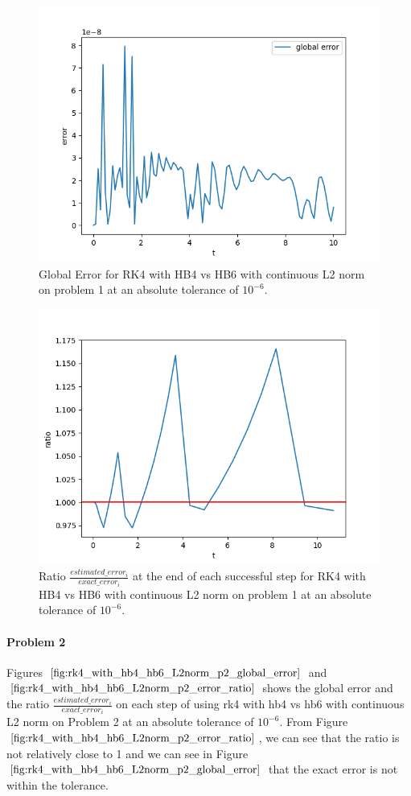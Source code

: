 \begin{figure}[H]
\centering
\includegraphics[width=0.7\linewidth]{./figures/rk4_with_hb4_hb6_L2norm_p1_global_error}
\caption{Global Error for RK4 with HB4 vs HB6 with continuous L2 norm on problem 1 at an absolute tolerance of $10^{-6}$.}
\label{fig:rk4_with_hb4_hb6_L2norm_p1_global_error}
\end{figure}

\begin{figure}[H]
\centering
\includegraphics[width=0.7\linewidth]{./figures/rk4_with_hb4_hb6_L2norm_p1_error_ratio}
\caption{Ratio $\frac{estimated\_error_i}{exact\_error_i}$ at the end of each successful step for RK4 with HB4 vs HB6 with continuous L2 norm on problem 1 at an absolute tolerance of $10^{-6}$.}
\label{fig:rk4_with_hb4_hb6_L2norm_p1_error_ratio}
\end{figure}

\paragraph{Problem 2} Figures $\ref{fig:rk4_with_hb4_hb6_L2norm_p2_global_error}$ and $\ref{fig:rk4_with_hb4_hb6_L2norm_p2_error_ratio}$ shows the global error and the ratio $\frac{estimated\_error_i}{exact\_error_i}$ on each step of using rk4 with hb4 vs hb6 with continuous L2 norm on Problem 2 at an absolute tolerance of $10^{-6}$. From Figure $\ref{fig:rk4_with_hb4_hb6_L2norm_p2_error_ratio}$, we can see that the ratio is not relatively close to 1 and we can see in Figure $\ref{fig:rk4_with_hb4_hb6_L2norm_p2_global_error}$ that the exact error is not within the tolerance.

